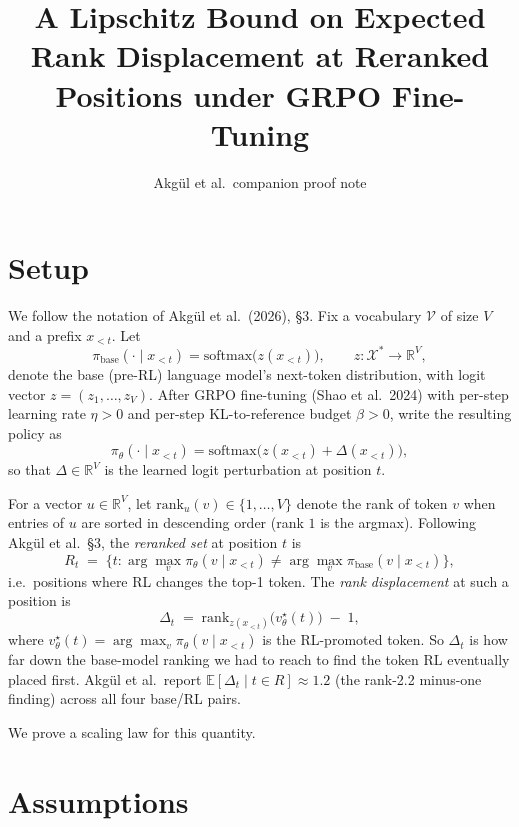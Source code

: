 \documentclass[11pt]{article}
\title{A Lipschitz Bound on Expected Rank Displacement at Reranked Positions under GRPO Fine-Tuning}
\author{Akg\"ul et al.\ companion proof note}
\date{}
\begin{document}
\maketitle

\section*{Setup}

We follow the notation of Akg\"ul et al.\ (2026), \S 3. Fix a vocabulary
$\mathcal{V}$ of size $V$ and a prefix $x_{<t}$. Let
\[
\pi_{\text{base}}(\cdot \mid x_{<t}) = \mathrm{softmax}\bigl(z(x_{<t})\bigr),
\qquad z : \mathcal{X}^* \to \mathbb{R}^V,
\]
denote the base (pre-RL) language model's next-token distribution, with
logit vector $z = (z_1, \dots, z_V)$. After GRPO fine-tuning (Shao et al.\
2024) with per-step learning rate $\eta > 0$ and per-step KL-to-reference
budget $\beta > 0$, write the resulting policy as
\[
\pi_\theta(\cdot \mid x_{<t}) = \mathrm{softmax}\bigl(z(x_{<t}) + \Delta(x_{<t})\bigr),
\]
so that $\Delta \in \mathbb{R}^V$ is the learned logit perturbation at
position $t$.

For a vector $u \in \mathbb{R}^V$, let $\mathrm{rank}_{u}(v) \in
\{1, \dots, V\}$ denote the rank of token $v$ when entries of $u$ are
sorted in descending order (rank $1$ is the argmax). Following Akg\"ul
et al.\ \S 3, the \emph{reranked set} at position $t$ is
\[
R_t \;=\; \bigl\{ t : \arg\max_v \pi_\theta(v \mid x_{<t})
                       \neq \arg\max_v \pi_{\text{base}}(v \mid x_{<t}) \bigr\},
\]
i.e.\ positions where RL changes the top-1 token. The \emph{rank
displacement} at such a position is
\[
\Delta_t \;=\; \mathrm{rank}_{z(x_{<t})}\!\bigl(v^\star_\theta(t)\bigr) \;-\; 1,
\]
where $v^\star_\theta(t) = \arg\max_v \pi_\theta(v \mid x_{<t})$ is the
RL-promoted token. So $\Delta_t$ is how far down the base-model ranking
we had to reach to find the token RL eventually placed first. Akg\"ul
et al.\ report $\mathbb{E}[\Delta_t \mid t \in R] \approx 1.2$
(the rank-2.2 minus-one finding) across all four base/RL pairs.

We prove a scaling law for this quantity.

\section*{Assumptions}
\end{document}
